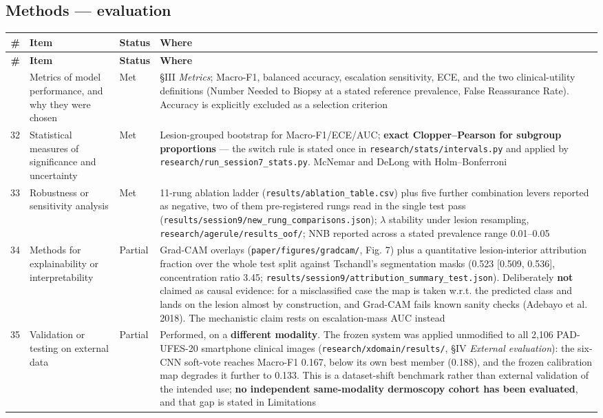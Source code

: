 \subsection*{Methods --- evaluation}


\begin{longtable}{@{}rp{}lp{}@{}}
\toprule
\textbf{\#} & \textbf{Item} & \textbf{Status} & \textbf{Where} \\
\midrule
\endfirsthead
\toprule
\textbf{\#} & \textbf{Item} & \textbf{Status} & \textbf{Where} \\
\midrule
\endhead
\bottomrule
\endfoot
31 & Metrics of model performance, and why they were chosen & Met & \S{}III \emph{Metrics}; Macro-F1, balanced accuracy, escalation sensitivity, ECE, and the two clinical-utility definitions (Number Needed to Biopsy at a stated reference prevalence, False Reassurance Rate). Accuracy is explicitly excluded as a selection criterion \\
32 & Statistical measures of significance and uncertainty & Met & Lesion-grouped bootstrap for Macro-F1/ECE/AUC; \textbf{exact Clopper--Pearson for subgroup proportions} --- the switch rule is stated once in \texttt{research/stats/intervals.py} and applied by \texttt{research/run\_session7\_stats.py}. McNemar and DeLong with Holm--Bonferroni \\
33 & Robustness or sensitivity analysis & Met & 11-rung ablation ladder (\texttt{results/ablation\_table.csv}) plus five further combination levers reported as negative, two of them pre-registered rungs read in the single test pass (\texttt{results/session9/new\_rung\_comparisons.json}); $\lambda$ stability under lesion resampling, \texttt{research/agerule/results\_oof/}; NNB reported across a stated prevalence range 0.01--0.05 \\
34 & Methods for explainability or interpretability & Partial & Grad-CAM overlays (\texttt{paper/figures/gradcam/}, Fig. 7) plus a quantitative lesion-interior attribution fraction over the whole test split against Tschandl's segmentation masks (0.523 [0.509, 0.536], concentration ratio 3.45; \texttt{results/session9/attribution\_summary\_test.json}). Deliberately \textbf{not} claimed as causal evidence: for a misclassified case the map is taken w.r.t. the predicted class and lands on the lesion almost by construction, and Grad-CAM fails known sanity checks (Adebayo et al. 2018). The mechanistic claim rests on escalation-mass AUC instead \\
35 & Validation or testing on external data & Partial & Performed, on a \textbf{different modality}. The frozen system was applied unmodified to all 2,106 PAD-UFES-20 smartphone clinical images (\texttt{research/xdomain/results/}, \S{}IV \emph{External evaluation}): the six-CNN soft-vote reaches Macro-F1 0.167, below its own best member (0.188), and the frozen calibration map degrades it further to 0.133. This is a dataset-shift benchmark rather than external validation of the intended use; \textbf{no independent same-modality dermoscopy cohort has been evaluated}, and that gap is stated in Limitations \\

\end{longtable}
